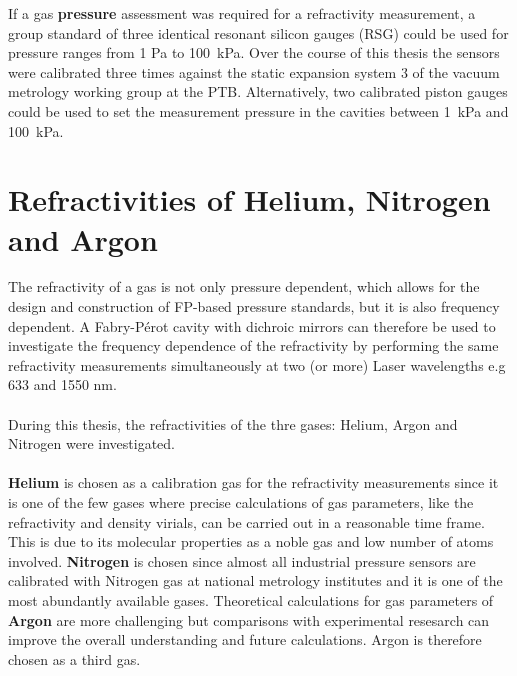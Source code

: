 \noindent
If a gas \textbf{pressure} assessment was required for a refractivity measurement, a group standard of three identical resonant silicon gauges (RSG) could be used for pressure ranges from 1 Pa to \mbox{100 kPa}. Over the course of this thesis the sensors were calibrated three times against the static expansion system 3 of the vacuum metrology working group at the PTB. Alternatively, two calibrated piston gauges could be used to set the measurement pressure in the cavities between \mbox{1 kPa} and \mbox{100 kPa}.
\newpage
\section{Refractivities of Helium, Nitrogen and Argon}
The refractivity of a gas is not only pressure dependent, which allows for the design and construction of FP-based pressure standards, but it is also frequency dependent. A Fabry-Pérot cavity with dichroic mirrors can therefore be used to investigate the frequency dependence of the refractivity by performing the same refractivity measurements simultaneously at two (or more) Laser wavelengths e.g 633 and 1550 nm.\\\\
During this thesis, the refractivities of the thre gases: Helium, Argon and Nitrogen were investigated. \\\\
\textbf{Helium} is chosen as a calibration gas for the refractivity measurements since it is one of the few gases where precise calculations of gas parameters, like the refractivity and density virials, can be carried out in a reasonable time frame. This is due to its molecular properties as a noble gas and low number of atoms involved. \textbf{Nitrogen} is chosen since almost all industrial pressure sensors are calibrated with Nitrogen gas at national metrology institutes and it is one of the most abundantly available gases. Theoretical calculations for gas parameters of \textbf{Argon} are more challenging but comparisons with experimental resesarch can improve the overall understanding and future calculations. Argon is therefore chosen as a third gas. \\\\
